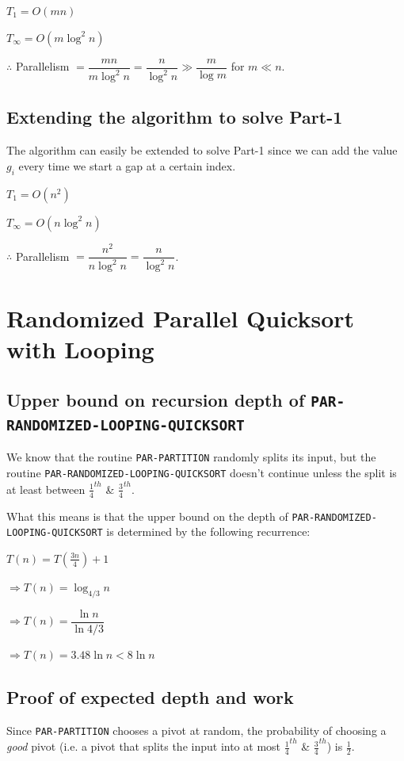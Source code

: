 \documentclass{article}
\begin{document}
$T_1 = O(mn)$

$T_{\infty} = O(m\log^2{n})$

$\therefore$ Parallelism $= \dfrac{mn}{m\log^2{n}} = \dfrac{n}{\log^2{n}} \gg \dfrac{m}{\log{m}}$ for $m \ll n$.

\subsection{Extending the algorithm to solve Part-1}

The algorithm can easily be extended to solve Part-1 since we can add
the value $g_i$ every time we start a gap at a certain index.

$T_1 = O(n^2)$

$T_{\infty} = O(n\log^2{n})$

$\therefore$ Parallelism $= \dfrac{n^2}{n\log^2{n}} = \dfrac{n}{\log^2{n}}$.

\clearpage

\section{Randomized Parallel Quicksort with Looping}

\subsection{Upper bound on recursion depth of \texttt{PAR-RANDOMIZED-LOOPING-QUICKSORT}}

We know that the routine \texttt{PAR-PARTITION} randomly splits its
input, but the routine \texttt{PAR-RANDOMIZED-LOOPING-QUICKSORT}
doesn't continue unless the split is at least between
$\frac{1}{4}^{th}$ \& $\frac{3}{4}^{th}$.

What this means is that the upper bound on the depth of
\texttt{PAR-RANDOMIZED-LOOPING-QUICKSORT} is determined by the
following recurrence:

$T(n) = T(\frac{3n}{4}) + 1$

$\Rightarrow T(n) = \log_{4/3}{n}$

$\Rightarrow T(n) = \dfrac{\ln{n}}{\ln{4/3}}$

$\Rightarrow T(n) = 3.48\ln{n} < 8\ln{n}$

\subsection{Proof of expected depth and work}

Since \texttt{PAR-PARTITION} chooses a pivot at random, the
probability of choosing a \textit{good} pivot (i.e. a pivot that
splits the input into at most $\frac{1}{4}^{th}$ \&
$\frac{3}{4}^{th}$) is $\frac{1}{2}$.
\end{document}
